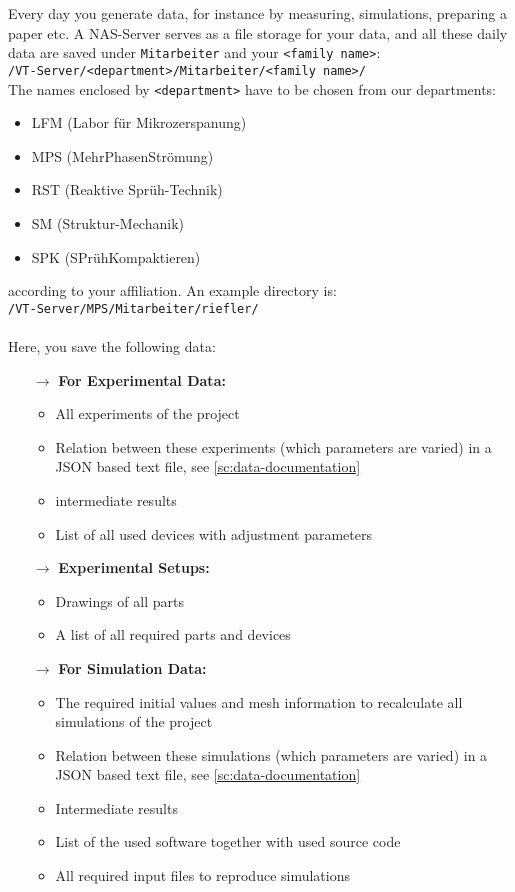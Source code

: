 Every day you generate data, for instance by measuring, simulations, preparing a
paper etc. A NAS-Server serves as a file storage for your data, and all these
daily data are saved under \texttt{Mitarbeiter} and your
\texttt{<family name>}: \\
\texttt{/VT-Server/<department>/Mitarbeiter/<family name>/} \\
The names enclosed by \texttt{<department>} have to be chosen from our
departments:
\begin{itemize}
  \item LFM (Labor für Mikrozerspanung)
  \item MPS (MehrPhasenStrömung)
  \item RST (Reaktive Sprüh-Technik)
  \item SM (Struktur-Mechanik)
  \item SPK (SPrühKompaktieren)
\end{itemize}
according to your affiliation. An example directory is: \\
\texttt{/VT-Server/MPS/Mitarbeiter/riefler/} \\
\\
Here, you save the following data:
\begin{itemize}
  \item[$\rightarrow$] \textbf{For Experimental Data:}
    \begin{itemize}
      \item All experiments of the project
      \item Relation between these experiments (which parameters are varied) in
            a JSON based text file, see \autoref{sc:data-documentation}
      \item intermediate results
      \item List of all used devices with adjustment parameters
    \end{itemize}
  \item[$\rightarrow$] \textbf{Experimental Setups:}
    \begin{itemize}
      \item Drawings of all parts
      \item A list of all required parts and devices
    \end{itemize}
  \item[$\rightarrow$] \textbf{For Simulation Data:}
    \begin{itemize}
      \item The required initial values and mesh information to recalculate all
            simulations of the project
      \item Relation between these simulations (which parameters are varied) in
            a JSON based text file, see \autoref{sc:data-documentation}
      \item Intermediate results
      \item List of the used software together with used source code
      \item All required input files to reproduce simulations
    \end{itemize}
\end{itemize}

